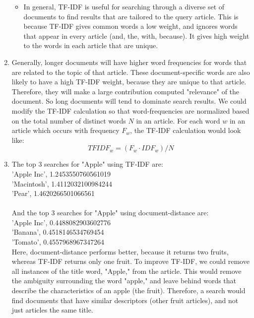 \documentclass[12pt,twoside]{article}
\begin{document}
\begin{problems}
\begin{problemparts}
\begin{enumerate}
\begin{itemize}
		\item In general, TF-IDF is useful for searching through a diverse set of documents to find results that are tailored to the 			query article. This is because TF-IDF gives common words a low weight, and ignores words that appear in every article (and, 		the, with, because). It gives high weight to the words in each article that are unique. 

		\end{itemize}

	\item Generally, longer documents will have higher word frequencies for words that are related to the topic of that article. These document-specific words are also likely to have a high TF-IDF weight, because they are unique to that article. Therefore, they will make a large contribution computed "relevance" of the document. So long documents will tend to dominate search results. We could modify the TF-IDF calculation so that word-frequencies are normalized based on the total number of distinct words $N$ in an article. For each word $w$ in an article which occurs with frequency $F_w$, the TF-IDF calculation would look like:
	$$ TFIDF_w = (F_w \cdot IDF_w) / N $$
	
	
	\item The top 3 searches for "Apple" using TF-IDF are: \\
	'Apple Inc', 1.2453550760561019 \\
	'Macintosh', 1.4112032100984244 \\
	'Pear', 1.4620266501066561 \\ \\
	And the top 3 searches for "Apple" using document-distance are: \\
	'Apple Inc', 0.4488082903602776 \\
	'Banana', 0.4518146534769454 \\
	'Tomato', 0.4557968967347264 \\
	
	Here, document-distance performs better, because it returns two fruits, whereas TF-IDF returns only one fruit. To improve TF-IDF, we could remove all instances of the title word, "Apple," from the article. This would remove the ambiguity surrounding the word "apple," and leave behind words that describe the characteristics of an apple (the fruit). Therefore, a search would find documents that have similar descriptors (other fruit articles), and not just articles the same title.
	
\end{enumerate}



\end{problemparts}

\end{problems}
\end{document}
